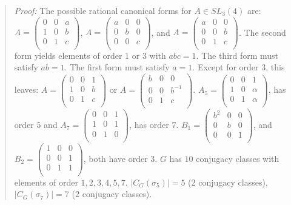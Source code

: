 \begin{quote}
\emph{Proof:}
The possible rational canonical forms for $A \in SL_3(4)$ are:
$A=
\left(
\begin{array} {ccc}
0 & 0 & a \\
1 & 0 & b \\
0 & 1 & c \\
\end{array}
\right)$,
$A=
\left(
\begin{array} {ccc}
a & 0 & 0 \\
0 & b & 0 \\
0 & 0 & c \\
\end{array}
\right)$,
and
$A=
\left(
\begin{array} {ccc}
a & 0 & 0 \\
0 & 0 & b \\
0 & 1 & c \\
\end{array}
\right)$.  The second form yields elements of order $1$ or $3$ with $abc=1$.
The third form must satisfy $ab=1$. The first form must satisfy $a=1$.  Except for order $3$,
this leaves:
$A=
\left(
\begin{array} {ccc}
0 & 0 & 1 \\
1 & 0 & b \\
0 & 1 & c \\
\end{array}
\right)$
or
$A=
\left(
\begin{array} {ccc}
b & 0 & 0 \\
0 & 0 & b^{-1} \\
0 & 1 & c \\
\end{array}
\right)$.
$A_5=
\left(
\begin{array} {ccc}
0 & 0 & 1 \\
1 & 0 & \alpha \\
0 & 1 & \alpha \\
\end{array}
\right)$, has order $5$ and
$A_7=
\left(
\begin{array} {ccc}
0 & 0 & 1 \\
1 & 0 & 1 \\
0 & 1 & 0 \\
\end{array}
\right)$, has order $7$.
$B_1=
\left(
\begin{array} {ccc}
b^2 & 0 & 0 \\
0 & b & 0 \\
0 & 0 & 1 \\
\end{array}
\right)$, and
$B_2=
\left(
\begin{array} {ccc}
1 & 0 & 0 \\
0 & 0 & 1 \\
0 & 1 & 1 \\
\end{array}
\right)$,  both have order $3$. $G$ has $10$ conjugacy classes with elements of order $1,2,3,4,5,7$.
$|C_G(\sigma_5)|=5$ ($2$ conjugacy classes),
$|C_G(\sigma_7)|=7$ ($2$ conjugacy classes).
\end{quote}
